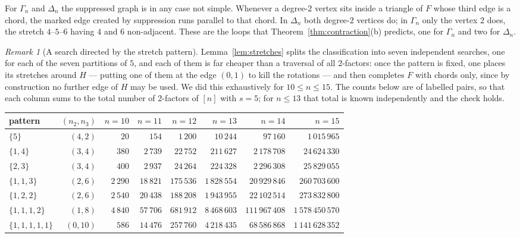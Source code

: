 \documentclass[11pt,a4paper]{article}
\theoremstyle{definition}
\theoremstyle{remark}
\newtheorem{remark}[theorem]{Remark}
\begin{document}
For $\Gamma_n$ and $\Delta_n$ the suppressed graph is in any case not simple. Whenever a degree-$2$ vertex sits inside a triangle of $F$ whose third edge is a chord, the marked edge created by suppression runs parallel to that chord. In $\Delta_n$ both degree-$2$ vertices do; in $\Gamma_n$ only the vertex $2$ does, the stretch $4$--$5$--$6$ having $4$ and $6$ non-adjacent. These are the loops that Theorem~\ref{thm:contraction}(b) predicts, one for $\Gamma_n$ and two for $\Delta_n$.

\begin{remark}[A search directed by the stretch pattern]\label{rem:patron}
Lemma~\ref{lem:stretches} splits the classification into seven independent searches, one for each of the seven partitions of $5$, and each of them is far cheaper than a traversal of all 2-factors: once the pattern is fixed, one places its stretches around $H$ --- putting one of them at the edge $(0,1)$ to kill the rotations --- and then completes $F$ with chords only, since by construction no further edge of $H$ may be used. We did this exhaustively for $10\le n\le15$. The counts below are of labelled pairs, so that each column sums to the total number of 2-factors of $[n]$ with $s=5$; for $n\le13$ that total is known independently and the check holds.
\begin{center}
\small
\setlength{\tabcolsep}{4pt}
\begin{tabular}{lrrrrrrr}
\toprule
pattern & $(n_2,n_3)$ & $n=10$ & $n=11$ & $n=12$ & $n=13$ & $n=14$ & $n=15$\\
\midrule
$\{5\}$          & $(4,2)$  & $20$  & $154$    & $1\,200$   & $10\,244$    & $97\,160$     & $1\,015\,965$ \\
$\{1,4\}$        & $(3,4)$  & $380$ & $2\,739$ & $22\,752$  & $211\,627$   & $2\,178\,708$ & $24\,624\,330$ \\
$\{2,3\}$        & $(3,4)$  & $400$ & $2\,937$ & $24\,264$  & $224\,328$   & $2\,296\,308$ & $25\,829\,055$ \\
$\{1,1,3\}$      & $(2,6)$  & $2\,290$ & $18\,821$ & $175\,536$ & $1\,828\,554$ & $20\,929\,846$ & $260\,703\,600$ \\
$\{1,2,2\}$      & $(2,6)$  & $2\,540$ & $20\,438$ & $188\,208$ & $1\,943\,955$ & $22\,102\,514$ & $273\,832\,800$ \\
$\{1,1,1,2\}$    & $(1,8)$  & $4\,840$ & $57\,706$ & $681\,912$ & $8\,468\,603$ & $111\,967\,408$ & $1\,578\,450\,570$ \\
$\{1,1,1,1,1\}$  & $(0,10)$ & $586$ & $14\,476$ & $257\,760$ & $4\,218\,435$ & $68\,586\,868$ & $1\,141\,628\,352$ \\

\end{tabular}
\end{center}
\end{remark}
\end{document}
